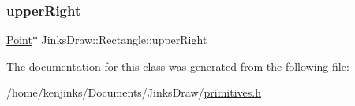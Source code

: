 \subsubsection{\texorpdfstring{upper\+Right}{upperRight}}
{\footnotesize\ttfamily \mbox{\hyperlink{class_jinks_draw_1_1_point}{Point}}$\ast$ Jinks\+Draw\+::\+Rectangle\+::upper\+Right\hspace{0.3cm}{\ttfamily [private]}}



The documentation for this class was generated from the following file\+:\begin{DoxyCompactItemize}
\item 
/home/kenjinks/\+Documents/\+Jinks\+Draw/\mbox{\hyperlink{primitives_8h}{primitives.\+h}}\end{DoxyCompactItemize}
